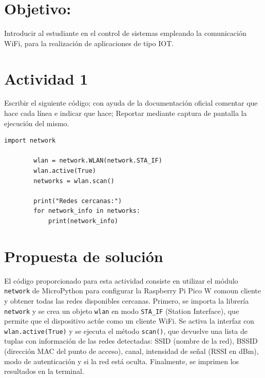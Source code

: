 \documentclass[letterpaper,12pt]{article}
\begin{document}
    

    \newpage
    \setcounter{page}{1}

    \section{Objetivo:}

    Introducir al estudiante en el control de sistemas empleando la comunicación WiFi, para la realización de aplicaciones de tipo IOT.

\section*{Actividad 1}

    \noindent Escribir el siguiente código; con ayuda de la documentación oficial comentar que hace cada línea e indicar que hace; Reportar mediante captura de pantalla la ejecución del mismo.

    \begin{lstlisting}[basicstyle=\ttfamily\footnotesize,caption={Figura 12-2. Código de ejemplo; actividad 1}]
        import network 

        wlan = network.WLAN(network.STA_IF) 
        wlan.active(True) 
        networks = wlan.scan() 

        print("Redes cercanas:") 
        for network_info in networks: 
            print(network_info) 
    \end{lstlisting}

    \section*{Propuesta de solución}

    El código proporcionado para esta actividad consiste en utilizar el módulo \texttt{network} de MicroPython para configurar la Raspberry Pi Pico W comoun cliente y obtener todas las redes disponibles cercanas. Primero, se importa la librería \texttt{network} y se crea un objeto \texttt{wlan} en modo \texttt{STA\_IF} (Station Interface), que permite que el dispositivo actúe como un cliente WiFi. Se activa la interfaz con \texttt{wlan.active(True)} y se ejecuta el método \texttt{scan()}, que devuelve una lista de tuplas con información de las redes detectadas: SSID (nombre de la red), BSSID (dirección MAC del punto de acceso), canal, intensidad de señal (RSSI en dBm), modo de autenticación y si la red está oculta. Finalmente, se imprimen los resultados en la terminal.
\end{document}
